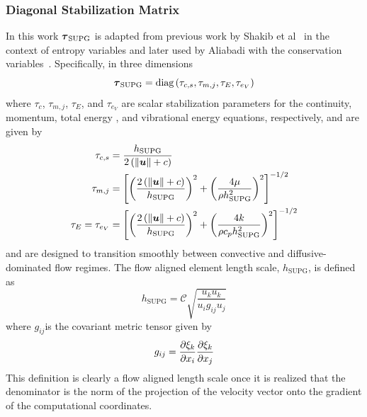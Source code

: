 \subsubsection{Diagonal Stabilization Matrix}
In this work ${\boldsymbol{\tau}}_{\text{SUPG}}$ is adapted from previous work by Shakib et al~\cite{shakib_hughes_ns} in the context of entropy variables and later used by Aliabadi with the conservation variables~\cite{skaliabadi_dissertation,aliabadi_tezduyar_IJNMF_1995}.  Specifically, in three dimensions
\begin{equation}
  {\boldsymbol{\tau}}_{\text{SUPG}} = \mbox{diag}\left(\tau_{c,s},\tau_{m,j},\tau_E,\tau_{e_V}\right)
\end{equation}
where $\tau_c$, $\tau_{m,j}$, $\tau_E$, and $\tau_{e_V}$ are scalar stabilization parameters for the continuity, momentum, total energy , and vibrational energy equations, respectively, and are given by
\begin{align}
  \tau_{c,s} &= \frac{h_{\text{SUPG}}}{2\left( \|{\boldsymbol{u}}\| + c\right)} \nonumber \\
  \tau_{m,j} &= \left[\left(\frac{2\left( \|{\boldsymbol{u}}\| + c\right)}{h_{\text{SUPG}}}\right)^2 + \left(\frac{4 \mu}{\rho h_{\text{SUPG}}^2}\right)^2\right]^{-1/2} \nonumber \\
  \tau_E = \tau_{e_V} &= \left[\left(\frac{2\left( \|{\boldsymbol{u}}\| + c\right)}{h_{\text{SUPG}}}\right)^2 + \left(\frac{4 k}{\rho c_p h_{\text{SUPG}}^2}\right)^2\right]^{-1/2} \nonumber 
\end{align}
and are designed to transition smoothly between convective and diffusive-dominated flow regimes.  The flow aligned element length scale, $h_{\text{SUPG}}$, is defined as
\begin{equation}
  h_{\text{SUPG}} = \mathcal{C}\sqrt{\frac{u_k u_k}{u_i g_{ij} u_j}}
\end{equation}
where $g_{ij}$is the covariant metric tensor given by
\begin{equation}
  g_{ij}={\frac{\partial{\xi_k}}{\partial{x_i}}}{\frac{\partial{\xi_k}}{\partial{x_j}}}
\end{equation}
This definition is clearly a flow aligned length scale once it is realized that the denominator is the norm of the projection of the velocity vector onto the gradient of the computational coordinates.

